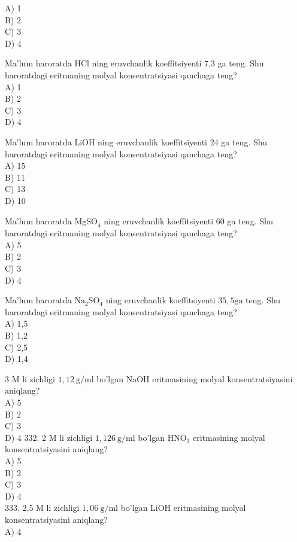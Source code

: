 A) 1\\
B) 2\\
C) 3\\
D) 4
  \item Ma'lum haroratda HCl ning eruvchanlik koeffitsiyenti 7,3 ga teng. Shu haroratdagi eritmaning molyal konsentratsiyasi qanchaga teng?\\
A) 1\\
B) 2\\
C) 3\\
D) 4
  \item Ma'lum haroratda LiOH ning eruvchanlik koeffitsiyenti 24 ga teng. Shu haroratdagi eritmaning molyal konsentratsiyasi qanchaga teng?\\
A) 15\\
B) 11\\
C) 13\\
D) 10
  \item Ma'lum haroratda $\mathrm{MgSO}_{4}$ ning eruvchanlik koeffitsiyenti 60 ga teng. Shu haroratdagi eritmaning molyal konsentratsiyasi qanchaga teng?\\
A) 5\\
B) 2\\
C) 3\\
D) 4
  \item Ma'lum haroratda $\mathrm{Na}_{2} \mathrm{SO}_{4}$ ning eruvchanlik koeffitsiyenti $35,5 \mathrm{ga}$ teng. Shu haroratdagi eritmaning molyal konsentratsiyasi qanchaga teng?\\
A) 1,5\\
B) 1,2\\
C) 2,5\\
D) 1,4
  \item 3 M li zichligi $1,12 \mathrm{~g} / \mathrm{ml}$ bo'lgan NaOH eritmasining molyal konsentratsiyasini aniqlang?\\
A) 5\\
B) 2\\
C) 3\\
D) 4
332. 2 M li zichligi $1,126 \mathrm{~g} / \mathrm{ml}$ bo'lgan $\mathrm{HNO}_{3}$ eritmasining molyal konsentratsiyasini aniqlang?\\
A) 5\\
B) 2\\
C) 3\\
D) 4\\
333. 2,5 M li zichligi $1,06 \mathrm{~g} / \mathrm{ml}$ bo'lgan LiOH eritmasining molyal konsentratsiyasini aniqlang?\\
A) 4\\
